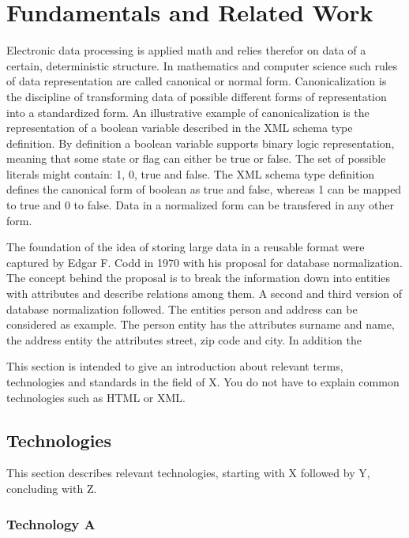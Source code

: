 \chapter{Fundamentals and Related Work\label{cha:chapter2}}

Electronic data processing is applied math and relies therefor on data of a certain, deterministic structure. In mathematics and computer science such rules of data representation are called canonical or normal form. Canonicalization is the discipline of transforming data of possible different forms of representation into a standardized form. An illustrative example of canonicalization is the representation of a boolean variable described in the XML schema type definition. By definition a boolean variable supports binary logic representation, meaning that some state or flag can either be true or false. The set of possible literals might contain: 1, 0, true and false. The XML schema type definition defines the canonical form of boolean as true and false, whereas 1 can be mapped to true and 0 to false. Data in a normalized form can be transfered in any other form.

The foundation of the idea of storing large data in a reusable format were captured by Edgar F. Codd in 1970 with his proposal for database normalization. The concept behind the proposal is to break the information down into entities with attributes and describe relations among them. A second and third version of database normalization followed. The entities person and address can be considered as example. The person entity has the attributes surname and name, the address entity the attributes street, zip code and city. In addition the 


This section is intended to give an introduction about relevant terms, technologies and standards in the field of X. You do not have to explain common technologies such as HTML or XML. 

\section{Technologies \label{sec:tech}}

This section describes relevant technologies, starting with X followed by Y, concluding with Z.

\subsection{Technology A\label{sec:aaa}}

